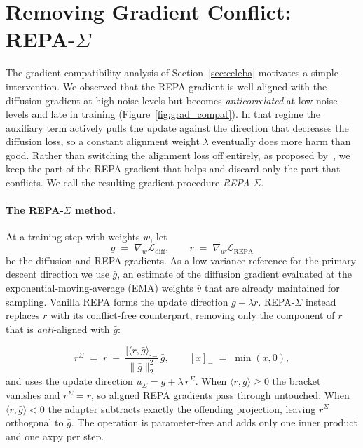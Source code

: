 \section{Removing Gradient Conflict: REPA-\texorpdfstring{$\Sigma$}{Sigma}}
\label{sec:repa_sigma}

The gradient-compatibility analysis of Section~\ref{sec:celeba} motivates a simple intervention.
We observed that the REPA gradient is well aligned with the diffusion gradient at high noise levels but becomes
\emph{anticorrelated} at low noise levels and late in training (Figure~\ref{fig:grad_compat}). In that regime the
auxiliary term actively pulls the update against the direction that decreases the diffusion loss, so a constant
alignment weight $\lambda$ eventually does more harm than good. Rather than switching the alignment loss off entirely,
as proposed by~\cite{wang2025haste}, we keep the part of the REPA gradient that helps and discard only the part that
conflicts. We call the resulting gradient procedure \emph{REPA-$\Sigma$}.

\paragraph{The REPA-\texorpdfstring{$\Sigma$}{Sigma} method.}
At a training step with weights $w$, let
\[
  g \;=\; \nabla_w \mathcal{L}_{\mathrm{diff}}, \qquad
  r \;=\; \nabla_w \mathcal{L}_{\mathrm{REPA}}
\]
be the diffusion and REPA gradients. As a low-variance reference for the primary descent direction we use
$\bar g$, an estimate of the diffusion gradient evaluated at the exponential-moving-average (EMA) weights $\bar v$
that are already maintained for sampling. Vanilla REPA forms the update direction $g + \lambda r$. REPA-$\Sigma$ instead
replaces $r$ with its conflict-free counterpart, removing only the component of $r$ that is \emph{anti}-aligned with
$\bar g$:

\begin{equation}
  r^{\Sigma}
  \;=\;
  r \;-\; \frac{\big[\langle r, \bar g\rangle\big]_{-}}{\|\bar g\|_2^2}\,\bar g,
  \qquad
  [x]_{-} \;=\; \min(x, 0),
  \label{eq:repa_sigma}
\end{equation}
and uses the update direction $u_{\Sigma} = g + \lambda\, r^{\Sigma}$. When $\langle r,\bar g\rangle \ge 0$ the bracket
vanishes and $r^{\Sigma}=r$, so aligned REPA gradients pass through untouched. When $\langle r,\bar g\rangle < 0$ the
adapter subtracts exactly the offending projection, leaving $r^{\Sigma}$ orthogonal to $\bar g$. The operation is
parameter-free and adds only one inner product and one axpy per step.

